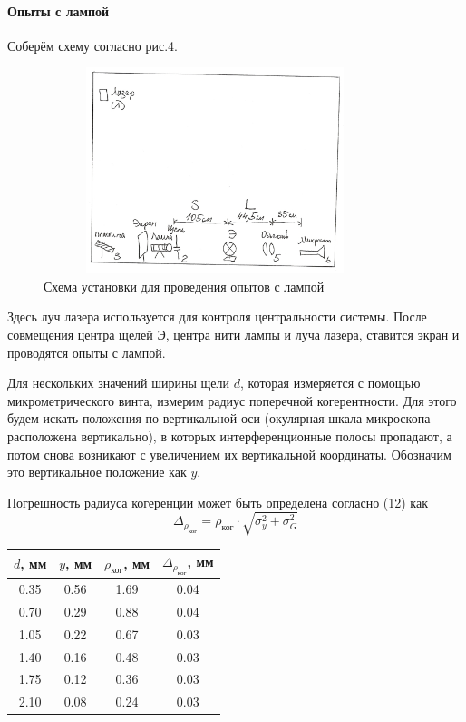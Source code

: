 \documentclass[12pt]{article}
\begin{document}
\paragraph{Опыты с лампой}
\par
	Соберём схему согласно рис.4.
\begin{figure}[h!]
	\centering
	\includegraphics[width = 10cm, height = 6cm]{image4.png}
	\caption{Схема установки для проведения опытов с лампой}
\end{figure}
\par
	Здесь луч лазера используется для контроля центральности системы. После совмещения центра щелей Э, центра нити лампы и луча лазера, ставится экран и проводятся опыты с лампой.
\par
	Для нескольких значений ширины щели $d$, которая измеряется с помощью микрометрического винта, измерим радиус поперечной когерентности. Для этого будем искать положения по вертикальной оси (окулярная шкала микроскопа расположена вертикально), в которых интерференционные полосы пропадают, а потом снова возникают с увеличением их вертикальной координаты. Обозначим это вертикальное положение как $y$.
\par
	Погрешность радиуса когеренции может быть определена согласно (12) как
\[
	\Delta_\text{$\rho_\text{ког}$} = \rho_\text{ког} \cdot \sqrt{\sigma_y^2 + \sigma_G^2}
\]
\begin{table}[h!]
	\centering
	\begin{tabular}{|c|c|c|c|}
	\hline
		$d$, мм & $y$, мм & $\rho_\text{ког}$, мм & $\Delta_\text{$\rho_\text{ког}$}$, мм \\
	\hline
		0.35	&0.56&	1.69&	0.04 \\
	\hline		
		0.70	&0.29	&0.88&	0.04 \\
	\hline
		1.05	&0.22	&0.67&	0.03 \\
	\hline
		1.40	&0.16	&0.48	&0.03 \\
	\hline	
		1.75	&0.12	&0.36&	0.03 \\
	\hline
2.10	&0.08	&0.24	&0.03 \\
	
	\hline
	\end{tabular}
\end{table}
\end{document}
